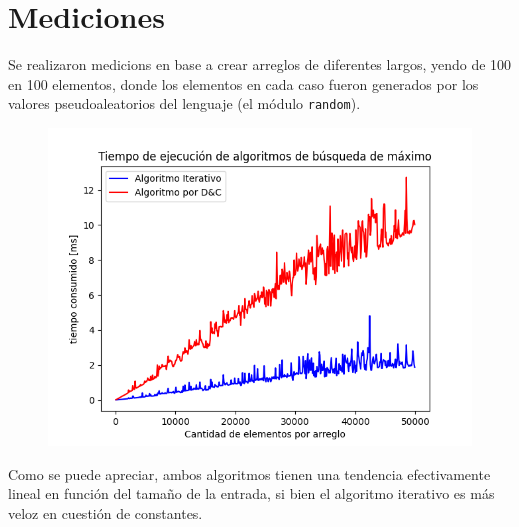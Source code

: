 \section{Mediciones}

Se realizaron medicions en base a crear arreglos de diferentes largos, yendo de 100 en 100 elementos, donde los elementos en cada caso fueron generados por los valores pseudoaleatorios del lenguaje (el módulo \texttt{random}). 

\begin{figure}[H]
    \centering
    \includegraphics[width=1\textwidth]{img/tiempos.png}
\end{figure}

Como se puede apreciar, ambos algoritmos tienen una tendencia efectivamente lineal en función del tamaño de la entrada, si bien el algoritmo iterativo es más veloz en cuestión de constantes.
